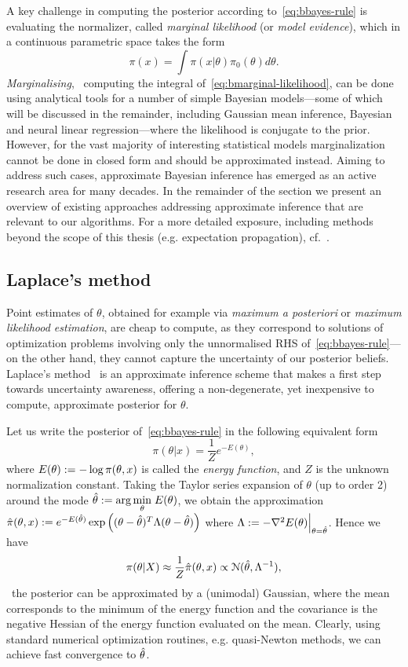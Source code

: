 A key challenge in computing the posterior according to~\cref{eq:bbayes-rule} is evaluating the normalizer, called \emph{marginal likelihood} (or \emph{model evidence}), which in a continuous parametric space takes the form
\[
\pi(x) = \int \pi(x|\theta) \pi_0(\theta) d\theta.
\label{eq:bmarginal-likelihood}
\]
\emph{Marginalising}, \ie~computing the integral of~\cref{eq:bmarginal-likelihood}, can be done using analytical tools for a number of simple Bayesian models---some of which will be discussed in the remainder, including Gaussian mean inference, Bayesian and neural linear regression---where the likelihood is conjugate to the prior. However, for the vast majority of interesting statistical models marginalization cannot be done in closed form and should be approximated instead. Aiming to address such cases, approximate Bayesian inference has emerged as an active research area for many decades. In the remainder of the section we present an overview of existing approaches addressing approximate inference that are relevant to our algorithms. For a more detailed exposure, including methods beyond the scope of this thesis (e.g. expectation propagation), cf.~\citep{bishop06,murphy12,angelino16}.

\subsection{Laplace's method}
\label{subsec:b-laplace-method}

Point estimates of $\theta$, obtained for example via \emph{maximum a posteriori} or \emph{maximum likelihood estimation}, are cheap to compute, as they correspond to solutions of optimization problems involving only the unnormalised RHS of~\cref{eq:bbayes-rule}---on the other hand, they cannot capture the uncertainty of our posterior beliefs. Laplace's method~\citep{mackay03} is an approximate inference scheme that makes a first step towards uncertainty awareness, offering a non-degenerate, yet inexpensive to compute, approximate posterior for $\theta$.

Let us write the posterior of~\cref{eq:bbayes-rule} in the following equivalent form
\[
\pi(\theta|x) = \frac{1}{Z} e^{-E(\theta)},
\]
where $E(\theta) := - \log \pi(\theta, x)$ is called the \emph{energy function}, and $ Z $ is the unknown normalization constant. Taking the Taylor series expansion of $\theta$ (up to order 2) around the mode $ {\hat{\theta} := \arg \underset{\theta}{\min} \;E(\theta)}$, we obtain the approximation 
$ \hat{\pi}(\theta, x) := e^{-E(\hat{\theta})}\exp\left((\theta - \hat{\theta})^T\Lambda (\theta - \hat{\theta})\right)$ where  $ \Lambda := -\nabla^2 E(\theta)\Big|_{\theta = \hat{\theta}}$.
Hence we have
\[
\pi(\theta|X) \approx \frac{1}{Z}   \hat{\pi}(\theta, x)  \propto \mathcal{N}(\hat{\theta}, \Lambda^{-1}), 
\label{eq:blaplace-approx}
\]  
\ie~the posterior can be approximated by a (unimodal) Gaussian, where the mean corresponds to the minimum of the energy function and the covariance is the negative Hessian of the energy function evaluated on the mean. Clearly, using standard numerical optimization routines, e.g. quasi-Newton methods, we can achieve fast convergence to $\hat{\theta}$. 

